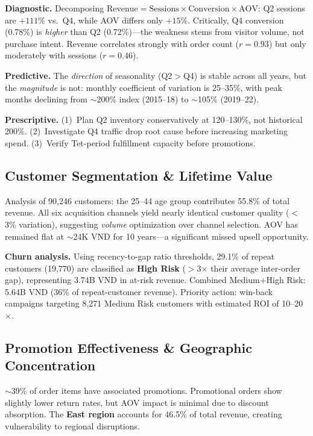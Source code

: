 \documentclass{article}
\begin{document}
\textbf{Diagnostic.} Decomposing $\text{Revenue} = \text{Sessions} \times \text{Conversion} \times \text{AOV}$: Q2 sessions are $+111\%$ vs.\ Q4, while AOV differs only $+15\%$. Critically, Q4 conversion (0.78\%) is \emph{higher} than Q2 (0.72\%)---the weakness stems from visitor volume, not purchase intent. Revenue correlates strongly with order count ($r = 0.93$) but only moderately with sessions ($r = 0.46$).

\textbf{Predictive.} The \emph{direction} of seasonality (Q2$>$Q4) is stable across all years, but the \emph{magnitude} is not: monthly coefficient of variation is 25--35\%, with peak months declining from $\sim$200\% index (2015--18) to $\sim$105\% (2019--22).

\textbf{Prescriptive.} (1)~Plan Q2 inventory conservatively at 120--130\%, not historical 200\%. (2)~Investigate Q4 traffic drop root cause before increasing marketing spend. (3)~Verify Tet-period fulfillment capacity before promotions.

\subsection{Customer Segmentation \& Lifetime Value}

Analysis of 90,246 customers: the 25--44 age group contributes 55.8\% of total revenue. All six acquisition channels yield nearly identical customer quality ($<$3\% variation), suggesting \emph{volume} optimization over channel selection. AOV has remained flat at $\sim$24K VND for 10 years---a significant missed upsell opportunity.

\textbf{Churn analysis.} Using recency-to-gap ratio thresholds, 29.1\% of repeat customers (19,770) are classified as \textbf{High Risk} ($>$3$\times$ their average inter-order gap), representing 3.74B VND in at-risk revenue. Combined Medium+High Risk: 5.64B VND (36\% of repeat-customer revenue). Priority action: win-back campaigns targeting 8,271 Medium Risk customers with estimated ROI of 10--20$\times$.

\subsection{Promotion Effectiveness \& Geographic Concentration}

$\sim$39\% of order items have associated promotions. Promotional orders show slightly lower return rates, but AOV impact is minimal due to discount absorption. The \textbf{East region} accounts for 46.5\% of total revenue, creating vulnerability to regional disruptions.
\end{document}
